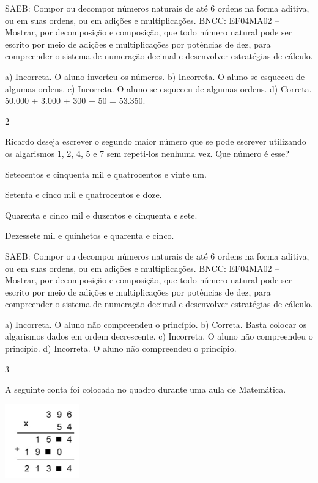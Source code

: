 \begin{mdframed}[linewidth=2pt,linecolor=salmao,roundcorner=2pt]
\begin{escolha}
{\begin{escolha}
SAEB: Compor ou decompor números naturais de até 6 ordens na
forma aditiva, ou em suas ordens, ou em adições e multiplicações.
BNCC: EF04MA02 -- Mostrar, por decomposição e composição, que todo número natural pode ser escrito
por meio de adições e multiplicações por potências de dez, para compreender o sistema de
numeração decimal e desenvolver estratégias de cálculo.

a) Incorreta. O aluno inverteu os números.
b) Incorreta. O aluno se esqueceu de algumas ordens.
c) Incorreta. O aluno se esqueceu de algumas ordens.
d) Correta. 50.000 + 3.000 + 300 + 50 = 53.350.

\num{2}

Ricardo deseja escrever o segundo maior número que se pode escrever
utilizando os algarismos 1, 2, 4, 5 e 7 sem repeti-los nenhuma vez.
Que número é esse?

\begin{escolha}
\item
  Setecentos e cinquenta mil e quatrocentos e vinte um.
\item
  Setenta e cinco mil e quatrocentos e doze.
\item
  Quarenta e cinco mil e duzentos e cinquenta e sete.
\item
  Dezessete mil e quinhetos e quarenta e cinco.
\end{escolha}

SAEB: Compor ou decompor números naturais de até 6 ordens na
forma aditiva, ou em suas ordens, ou em adições e multiplicações.
BNCC: EF04MA02 -- Mostrar, por decomposição e composição, que todo número natural pode ser escrito
por meio de adições e multiplicações por potências de dez, para compreender o sistema de
numeração decimal e desenvolver estratégias de cálculo.

a) Incorreta. O aluno não compreendeu o princípio.
b) Correta. Basta colocar os algarismos dados em ordem decrescente.
c) Incorreta. O aluno não compreendeu o princípio.
d) Incorreta. O aluno não compreendeu o princípio.

\num{3}

A seguinte conta foi colocada no quadro durante uma aula de Matemática.

\includegraphics[width=1.26282in,height=1.25762in]{media/image159.png}


\end{escolha}}
\end{escolha}
\end{mdframed}
